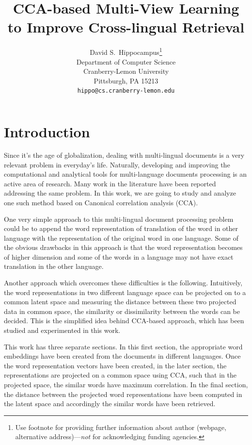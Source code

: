 \documentclass{article} %
\title{CCA-based Multi-View Learning to Improve Cross-lingual Retrieval}
\author{
David S.~Hippocampus\thanks{ Use footnote for providing further information
about author (webpage, alternative address)---\emph{not} for acknowledging
funding agencies.} \\
Department of Computer Science\\
Cranberry-Lemon University\\
Pittsburgh, PA 15213 \\
\texttt{hippo@cs.cranberry-lemon.edu} \\
}
\begin{document}
\maketitle

\begin{abstract}

\end{abstract}

\section{Introduction}

Since it's the age of globalization, dealing with multi-lingual documents is a very relevant problem in everyday's life. Naturally, developing and improving the computational and analytical tools for multi-language documents processing is an active area of research. Many work in the literature have been reported addressing the same problem. In this work, we are going to study and analyze one such method based on Canonical correlation analysis (CCA).

One very simple approach to this multi-lingual document processing problem could be to append the word representation of translation of the word in other language with the representation of the original word in one language. Some of the obvious drawbacks in this approach is that the word representation becomes of higher dimension and some of the words in a language may not have exact translation in the other language.

Another approach which overcomes these difficulties is the following. Intuitively, the word representations in two different language space can be projected on to a common latent space and measuring the distance between these two projected data in common space, the similarity or dissimilarity between the words can be decided. This is the simplified idea behind CCA-based approach, which has been studied and experimented in this work.

This work has three separate sections. In this first section, the appropriate word embeddings have been created from the documents in different languages. Once the word representation vectors have been created, in the later section, the representations are projected on a common space using CCA, such that in the projected space, the similar words have maximum correlation. In the final section, the distance between the projected word representations have been computed in the latent space and accordingly the similar words have been retrieved.
\end{document}
